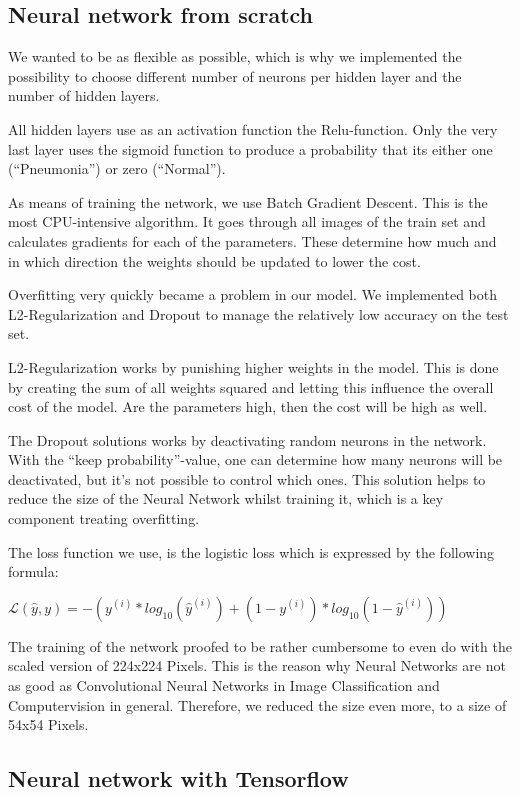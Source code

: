 \documentclass{article}
\begin{document}
\subsection{Neural network from scratch}
\label{sec:neural_network_from_scarch}

We wanted to be as flexible as possible, which is why we implemented the possibility to choose 
different number of neurons per hidden layer and the number of hidden layers.

All hidden layers use as an activation function the Relu-function. 
Only the very last layer uses the sigmoid function to produce a probability that its either one (“Pneumonia”) 
or zero (“Normal”).

As means of training the network, we use Batch Gradient Descent. 
This is the most CPU-intensive algorithm. 
It goes through all images of the train set and calculates gradients for each of the parameters. 
These determine how much and in which direction the weights should be updated to lower the cost.

Overfitting very quickly became a problem in our model. 
We implemented both L2-Regularization and Dropout to manage the relatively low accuracy on the test set. 

L2-Regularization works by punishing higher weights in the model. 
This is done by creating the sum of all weights squared and letting this influence the overall cost of the model. 
Are the parameters high, then the cost will be high as well.

The Dropout solutions works by deactivating random neurons in the network. 
With the “keep probability”-value, one can determine how many neurons will be deactivated, 
but it's not possible to control which ones. 
This solution helps to reduce the size of the Neural Network whilst training it, 
which is a key component treating overfitting.

The loss function we use, is the logistic loss which is expressed by the following formula:

$\mathcal{L}(\hat{y},y)=-(y^{(i)}*log_{10}(\hat{y}^{(i)})+(1-y^{(i)})*log_{10}(1-\hat{y}^{(i)}))$

The training of the network proofed to be rather cumbersome to even do with the scaled version of 224x224 Pixels. 
This is the reason why Neural Networks are not as good as Convolutional Neural Networks in Image 
Classification and Computervision in general. 
Therefore, we reduced the size even more, to a size of 54x54 Pixels.

\subsection{Neural network with Tensorflow}
\label{sec:neural_network_with_tensorflow}
\end{document}
